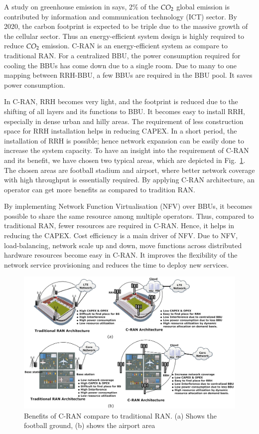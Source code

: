 \begin{multicols}{2}
A study on greenhouse emission in \cite{art3-key33} says, 2\% of the $CO_{\rm 2}$ global emission is contributed by information and communication technology (ICT) sector. By 2020, the carbon footprint is expected to be triple due to the massive growth of the cellular sector. Thus an energy-efficient system design is highly required to reduce $CO_{\rm 2}$ emission. C-RAN is an energy-efficient system as compare to traditional RAN. For a centralized BBU, the power consumption required for cooling the BBUs has come down due to a single room. Due to many to one mapping between RRH-BBU, a few BBUs are required in the BBU pool. It saves power consumption. 

In C-RAN, RRH becomes very light, and the footprint is reduced due to the shifting of all layers and its functions to BBU. It becomes easy to install RRH, especially in dense urban and hilly areas. The requirement of less construction space for RRH installation helps in reducing CAPEX. In a short period, the installation of RRH is possible; hence network expansion can be easily done to increase the system capacity. To have an insight into the requirement of C-RAN and its benefit, we have chosen two typical areas, which are depicted in Fig.~\ref{fig02}. The chosen areas are football stadium and airport, where better network coverage with high throughput is essentially required. By applying C-RAN architecture, an operator can get more benefits as compared to tradition RAN. 

By implementing Network Function Virtualisation (NFV) over BBUs, it becomes possible to share the same resource among multiple operators. Thus, compared to traditional RAN, fewer resources are required in C-RAN. Hence, it helps in reducing the CAPEX. Cost efficiency is a main driver of NFV. Due to NFV, load-balancing, network scale up and down, move functions across distributed hardware resources become easy in C-RAN. It improves the flexibility of the network service provisioning and reduces the time to deploy new services.
\end{multicols}

\begin{figure}[H]
\centering
\includegraphics[scale=.7]{src/Figures/chap3/fig02.jpg}
\caption{Benefits of C-RAN compare to traditional RAN. (a) Shows the football ground, (b) shows the airport area}\label{fig02}
\end{figure}


